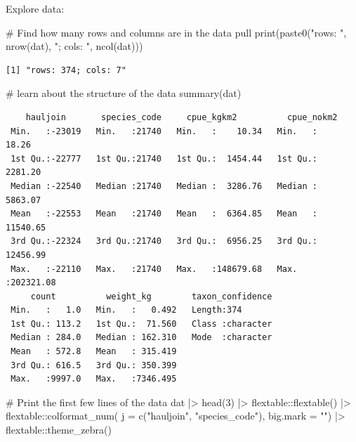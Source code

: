 \documentclass[
  letterpaper,
  oneside,
  open=any]{scrbook}
\newenvironment{Shaded}{\begin{snugshade}}{\end{snugshade}}
\newcommand{\AttributeTok}[1]{\textcolor[rgb]{0.40,0.45,0.13}{#1}}
\newcommand{\CommentTok}[1]{\textcolor[rgb]{0.37,0.37,0.37}{#1}}
\newcommand{\DecValTok}[1]{\textcolor[rgb]{0.68,0.00,0.00}{#1}}
\newcommand{\FunctionTok}[1]{\textcolor[rgb]{0.28,0.35,0.67}{#1}}
\newcommand{\NormalTok}[1]{\textcolor[rgb]{0.00,0.23,0.31}{#1}}
\newcommand{\SpecialCharTok}[1]{\textcolor[rgb]{0.37,0.37,0.37}{#1}}
\newcommand{\StringTok}[1]{\textcolor[rgb]{0.13,0.47,0.30}{#1}}
\begin{document}
Explore data:

\begin{Shaded}
\begin{Highlighting}[]
\CommentTok{\# Find how many rows and columns are in the data pull}
\FunctionTok{print}\NormalTok{(}\FunctionTok{paste0}\NormalTok{(}\StringTok{"rows: "}\NormalTok{, }\FunctionTok{nrow}\NormalTok{(dat), }\StringTok{"; cols: "}\NormalTok{, }\FunctionTok{ncol}\NormalTok{(dat)))}
\end{Highlighting}
\end{Shaded}

\begin{verbatim}
[1] "rows: 374; cols: 7"
\end{verbatim}

\begin{Shaded}
\begin{Highlighting}[]
\CommentTok{\# learn about the structure of the data}
\FunctionTok{summary}\NormalTok{(dat)}
\end{Highlighting}
\end{Shaded}

\begin{verbatim}
    hauljoin       species_code     cpue_kgkm2          cpue_nokm2       
 Min.   :-23019   Min.   :21740   Min.   :    10.34   Min.   :    18.26  
 1st Qu.:-22777   1st Qu.:21740   1st Qu.:  1454.44   1st Qu.:  2281.20  
 Median :-22540   Median :21740   Median :  3286.76   Median :  5863.07  
 Mean   :-22553   Mean   :21740   Mean   :  6364.85   Mean   : 11540.65  
 3rd Qu.:-22324   3rd Qu.:21740   3rd Qu.:  6956.25   3rd Qu.: 12456.99  
 Max.   :-22110   Max.   :21740   Max.   :148679.68   Max.   :202321.08  
     count          weight_kg        taxon_confidence  
 Min.   :   1.0   Min.   :   0.492   Length:374        
 1st Qu.: 113.2   1st Qu.:  71.560   Class :character  
 Median : 284.0   Median : 162.310   Mode  :character  
 Mean   : 572.8   Mean   : 315.419                     
 3rd Qu.: 616.5   3rd Qu.: 350.399                     
 Max.   :9997.0   Max.   :7346.495                     
\end{verbatim}

\begin{Shaded}
\begin{Highlighting}[]
\CommentTok{\# Print the first few lines of the data }
\NormalTok{dat }\SpecialCharTok{|\textgreater{}} 
  \FunctionTok{head}\NormalTok{(}\DecValTok{3}\NormalTok{) }\SpecialCharTok{|\textgreater{}} 
\NormalTok{  flextable}\SpecialCharTok{::}\FunctionTok{flextable}\NormalTok{() }\SpecialCharTok{|\textgreater{}}
\NormalTok{  flextable}\SpecialCharTok{::}\FunctionTok{colformat\_num}\NormalTok{(}
      \AttributeTok{j =} \FunctionTok{c}\NormalTok{(}\StringTok{"hauljoin"}\NormalTok{, }\StringTok{"species\_code"}\NormalTok{), }
      \AttributeTok{big.mark =} \StringTok{""}\NormalTok{) }\SpecialCharTok{|\textgreater{}} 
\NormalTok{  flextable}\SpecialCharTok{::}\FunctionTok{theme\_zebra}\NormalTok{()}
\end{Highlighting}
\end{Shaded}
\end{document}
